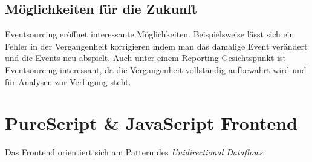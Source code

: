 \subsection*{Möglichkeiten für die Zukunft}
Eventsourcing eröffnet interessante Möglichkeiten. Beispielsweise lässt sich ein
Fehler in der Vergangenheit korrigieren indem man das damalige Event verändert
und die Events neu abspielt. Auch unter einem Reporting Gesichtspunkt ist
Eventsourcing interessant, da die Vergangenheit vollständig aufbewahrt wird und
für Analysen zur Verfügung steht.


\section{PureScript \& JavaScript Frontend}
\label{sec:frontend}
Das Frontend orientiert sich am Pattern des \textit{Unidirectional Dataflows}.

